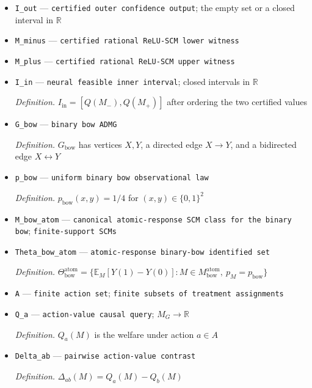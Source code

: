 \documentclass{article}
\begin{document}
\begin{itemize}
  \item \texttt{I\_\allowbreak{}out} --- \texttt{certified outer confidence output}; the empty set or a closed interval in \(\mathbb R\)
  \item \texttt{M\_\allowbreak{}minus} --- \texttt{certified rational ReLU-\allowbreak{}SCM lower witness}
  \item \texttt{M\_\allowbreak{}plus} --- \texttt{certified rational ReLU-\allowbreak{}SCM upper witness}
  \item \texttt{I\_\allowbreak{}in} --- \texttt{neural feasible inner interval}; closed intervals in \(\mathbb R\)
  \par\smallskip\noindent\emph{Definition.} \(I_{\mathrm{in}}=[Q(M_-),Q(M_+)]\) after ordering the two certified values
  \item \texttt{G\_\allowbreak{}bow} --- \texttt{binary bow ADMG}
  \par\smallskip\noindent\emph{Definition.} \(G_{\mathrm{bow}}\) has vertices \(X,Y\), a directed edge \(X\to Y\), and a bidirected edge \(X\leftrightarrow Y\)
  \item \texttt{p\_\allowbreak{}bow} --- \texttt{uniform binary bow observational law}
  \par\smallskip\noindent\emph{Definition.} \(p_{\mathrm{bow}}(x,y)=1/4\) for \((x,y)\in\{0,1\}^2\)
  \item \texttt{M\_\allowbreak{}bow\_\allowbreak{}atom} --- \texttt{canonical atomic-\allowbreak{}response SCM class for the binary bow}; \texttt{finite-\allowbreak{}support SCMs}
  \item \texttt{Theta\_\allowbreak{}bow\_\allowbreak{}atom} --- \texttt{atomic-\allowbreak{}response binary-\allowbreak{}bow identified set}
  \par\smallskip\noindent\emph{Definition.} \(\Theta_{\mathrm{bow}}^{\mathrm{atom}}=\{\mathbb E_M[Y(1)-Y(0)]:M\in M_{\mathrm{bow}}^{\mathrm{atom}},\ p_M=p_{\mathrm{bow}}\}\)
  \item \texttt{A} --- \texttt{finite action set}; \texttt{finite subsets of treatment assignments}
  \item \texttt{Q\_\allowbreak{}a} --- \texttt{action-\allowbreak{}value causal query}; \(M_G\to\mathbb R\)
  \par\smallskip\noindent\emph{Definition.} \(Q_a(M)\) is the welfare under action \(a\in A\)
  \item \texttt{Delta\_\allowbreak{}ab} --- \texttt{pairwise action-\allowbreak{}value contrast}
  \par\smallskip\noindent\emph{Definition.} \(\Delta_{ab}(M)=Q_a(M)-Q_b(M)\)
\end{itemize}
\end{document}
